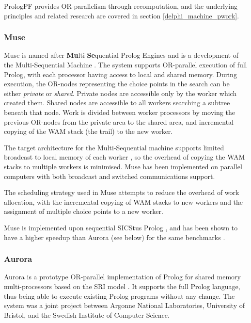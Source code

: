 PrologPF provides OR-parallelism through recomputation, and the underlying
principles and related research are covered in section
\ref{delphi_machine_pwork}.

\subsubsection{Muse}

Muse \cite{AKM91}
is named after \textbf{Mu}lti-\textbf{Se}quential Prolog Engines and is
a development of the Multi-Sequential Machine \cite{Ali87}.
The system supports OR-parallel execution of full Prolog, with each processor having
access to local and shared memory. 
During execution, the OR-nodes representing the choice points in the
search can be either \textit{private} or \textit{shared}.
Private nodes are accessible only by the worker which created them.
Shared nodes are accessible to all workers searching a subtree beneath that
node. Work is divided between worker processors by
moving the previous OR-nodes from the private area to the shared area, and
incremental copying of the WAM stack (the trail) to the new worker.

The target architecture for the Multi-Sequential machine supports limited
broadcast to local memory of each worker \cite{Ali88},
so the overhead of copying the WAM
stacks to multiple workers is minimised.  Muse has been implemented on
parallel computers with both broadcast and switched communications support.

The scheduling strategy used in Muse attempts to reduce the overhead of
work allocation, with the incremental copying of WAM stacks to new workers
and the assignment of multiple choice points to a new worker.

Muse is implemented upon sequential SICStus Prolog \cite{BBP+94}, and has been shown to
have a higher speedup than Aurora (see below) for the same benchmarks
\cite{AKM91}.

\subsubsection{Aurora}


Aurora \cite{LWH+90} is a prototype OR-parallel implementation of Prolog for
shared memory multi-processors based on the SRI model \cite{War87}.
It supports the full Prolog language,
thus being able to execute existing Prolog programs without any change.
The system was a joint project between Argonne National Laboratories,
University of Bristol, and the Swedish Institute of Computer Science.

